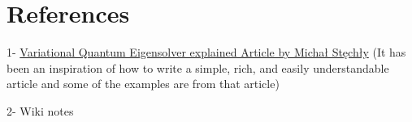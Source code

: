\documentclass[11pt]{article}
\begin{document}
	
	
	\section*{References}
	1- \href{https://www.mustythoughts.com/post/variational-quantum-eigensolver-explained}{Variational Quantum Eigensolver explained Article by Michał Stęchły} (It has been an inspiration of how to write a simple, rich, and easily understandable article and some of the examples are from that article)
	
	2- Wiki notes
	
	
	
\end{document}
